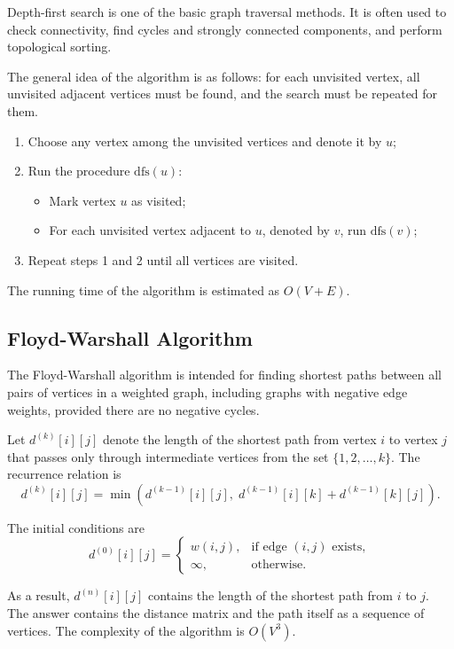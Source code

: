 \documentclass[a4paper,final]{article}
\begin{document}
Depth-first search is one of the basic graph traversal methods. It is often used to check connectivity, find cycles and strongly connected components, and perform topological sorting.

The general idea of the algorithm is as follows: for each unvisited vertex, all unvisited adjacent vertices must be found, and the search must be repeated for them.

\begin{enumerate}
  \item Choose any vertex among the unvisited vertices and denote it by $u$;
  \item Run the procedure $\mathrm{dfs}(u)$:
  \begin{itemize}
    \item Mark vertex $u$ as visited;
    \item For each unvisited vertex adjacent to $u$, denoted by $v$, run $\mathrm{dfs}(v)$;
  \end{itemize}
  \item Repeat steps 1 and 2 until all vertices are visited.
\end{enumerate}

The running time of the algorithm is estimated as $O(V+E)$.

	\subsection{Floyd-Warshall Algorithm}

The Floyd-Warshall algorithm is intended for finding shortest paths between all pairs of vertices in a weighted graph, including graphs with negative edge weights, provided there are no negative cycles.

Let $d^{(k)}[i][j]$ denote the length of the shortest path from vertex $i$ to vertex $j$ that passes only through intermediate vertices from the set $\{1, 2, \ldots, k\}$. The recurrence relation is
\[
d^{(k)}[i][j] = \min\!\left(d^{(k-1)}[i][j],\; d^{(k-1)}[i][k] + d^{(k-1)}[k][j]\right).
\]

The initial conditions are
\[
d^{(0)}[i][j] = \begin{cases} w(i,j), & \text{if edge } (i,j) \text{ exists},\\ \infty, & \text{otherwise}. \end{cases}
\]

As a result, $d^{(n)}[i][j]$ contains the length of the shortest path from $i$ to $j$. The answer contains the distance matrix and the path itself as a sequence of vertices. The complexity of the algorithm is $O(V^3)$.
\end{document}
